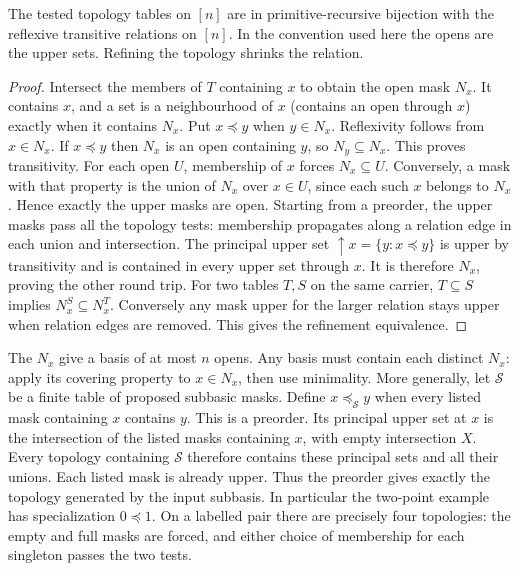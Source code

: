 \begin{theorem}\label{idx-finite26}
The tested topology tables on $[n]$ are in primitive-recursive bijection
with the reflexive transitive relations on $[n]$. In the convention used here
the opens are the upper sets. Refining the topology shrinks the relation.
\end{theorem}
\begin{proof}
Intersect the members of $T$ containing $x$ to obtain the open mask $N_x$.
It contains $x$, and a set is a neighbourhood of $x$ (contains an open
through $x$) exactly when it contains $N_x$. Put $x\preceq y$ when
$y\in N_x$. Reflexivity follows from $x\in N_x$. If $x\preceq y$ then
$N_x$ is an open containing $y$, so $N_y\subseteq N_x$. This proves
transitivity. For each open $U$, membership of $x$ forces $N_x\subseteq U$.
Conversely, a mask with that property is the union of $N_x$ over $x\in U$,
since each such $x$ belongs to $N_x$. Hence exactly the upper masks are open.
Starting from a preorder, the upper masks pass all the topology tests:
membership propagates along a relation edge in each union and intersection.
The principal upper set $\uparrow x=\{y:x\preceq y\}$ is upper by
transitivity and is contained in every upper set through $x$. It is
therefore $N_x$, proving the other round trip. For two tables $T,S$ on
the same carrier, $T\subseteq S$ implies $N^S_x\subseteq N^T_x$.
Conversely any mask upper for the larger relation stays upper when relation
edges are removed. This gives the refinement equivalence.
\end{proof}

The $N_x$ give a basis of at most $n$ opens. Any basis must contain each
distinct $N_x$: apply its covering property to $x\in N_x$, then use
minimality. More generally, let $\mathcal S$ be a finite table of proposed
subbasic masks. Define $x\preceq_{\mathcal S}y$ when every listed mask
containing $x$ contains $y$. This is a preorder. Its principal upper set at
$x$ is the intersection of the listed masks containing $x$, with empty
intersection $X$. Every topology containing $\mathcal S$ therefore contains
these principal sets and all their unions. Each listed mask is already
upper. Thus the preorder gives exactly the topology generated by the input
subbasis. In particular the two-point example has specialization $0\preceq1$.
On a labelled pair there are precisely four topologies: the empty and full
masks are forced, and either choice of membership for each singleton
passes the two tests.

